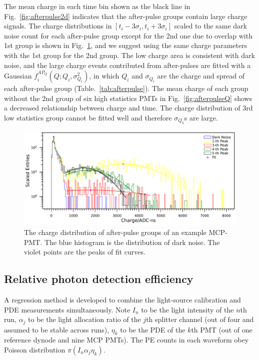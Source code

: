 The mean charge in each time bin shown as the black line in Fig.~\ref{fig:afterpulse2d} indicates that the after-pulse groups contain large charge signals. The charge distributions in $[t_i-3\sigma_i,t_i+3\sigma_i]$ scaled to the same dark noise count for each after-pulse group except for the 2nd one due to overlap with 1st group is shown in Fig.~\ref{fig:afterpulsecharge}, and we suggest using the same charge parameters with the 1st group for the 2nd group. The low charge area is consistent with dark noise, and the large charge events contributed from after-pulses are fitted with a Gaussian $f^{AP_Q}_i(Q;Q_i,\sigma_{Q_i}^2)$, in which $Q_i$ and $\sigma_{Q_i}$ are the charge and spread of each after-pulse group (Table.~\ref{tab:afterpulse}). The mean charge of each group without the 2nd group of six high statistics PMTs in Fig.~\ref{fig:afterpulseQ} shows a decreased relationship between charge and time. The charge distribution of 3rd low statistics group cannot be fitted well and therefore $\sigma_{Q_3}$s are large. 

\begin{figure}[!htbp]
    \centering
    \includegraphics[width=\textwidth]{figures/method/triggerafterpulseCharge.pdf}
    \caption{The charge distribution of after-pulse groups of an example MCP-PMT. The blue histogram is the distribution of dark noise. The violet points are the peaks of fit curves.}
    \label{fig:afterpulsecharge}
\end{figure}

\subsection{Relative photon detection efficiency}
\label{sec:PDE}
A regression method is developed to combine the light-source calibration and PDE measurements simultaneously. Note $I_n$ to be the light intensity of the $n$th run, $\alpha_j$ to be the light allocation ratio of the $j$th splitter channel (out of four and assumed to be stable across runs), $\eta_k$ to be the PDE of the $k$th PMT (out of one reference dynode and nine MCP PMTs). The PE counts in each waveform obey Poisson distribution $\pi(I_n\alpha_j\eta_k)$.

